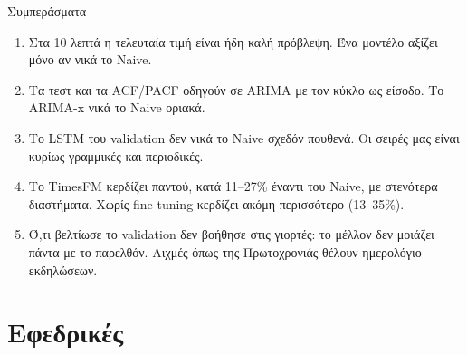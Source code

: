 \documentclass[aspectratio=169,10pt]{beamer}
\begin{document}
\begin{frame}{Συμπεράσματα}
  \begin{enumerate}
    \item Στα 10 λεπτά η τελευταία τιμή είναι ήδη καλή πρόβλεψη. Ένα μοντέλο αξίζει μόνο αν \alert{νικά το Naive}.
    \vspace{0.5em}
    \item Τα τεστ και τα ACF/PACF οδηγούν σε ARIMA με τον κύκλο ως είσοδο. Το ARIMA-x νικά το Naive \alert{οριακά}.
    \vspace{0.5em}
    \item Το LSTM του validation δεν νικά το Naive σχεδόν πουθενά. Οι σειρές μας είναι κυρίως γραμμικές και περιοδικές.
    \vspace{0.5em}
    \item Το \alert{TimesFM} κερδίζει παντού, κατά 11–27\% έναντι του Naive, με στενότερα διαστήματα. Χωρίς fine-tuning κερδίζει ακόμη περισσότερο (13–35\%).
    \vspace{0.5em}
    \item Ό,τι βελτίωσε το validation δεν βοήθησε στις γιορτές: \alert{το μέλλον δεν μοιάζει πάντα με το παρελθόν}. Αιχμές όπως της Πρωτοχρονιάς θέλουν ημερολόγιο εκδηλώσεων.
  \end{enumerate}
\end{frame}

\appendix
\section{Εφεδρικές}
\end{document}
